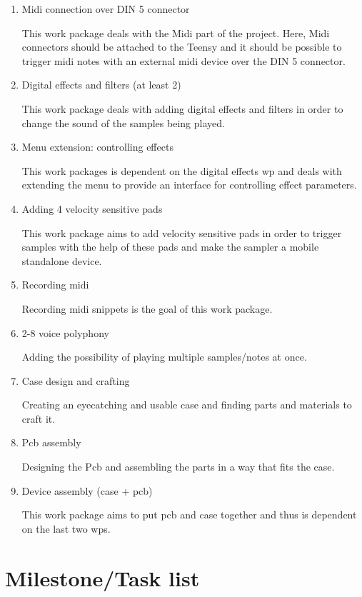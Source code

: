 \begin{enumerate}
	\item Midi connection over DIN 5 connector

		This work package deals with the Midi part of the project. Here, Midi connectors
		should be attached to the Teensy and it should be possible to trigger midi notes
		with an external midi device over the DIN 5 connector.

	\item Digital effects and filters (at least 2)

		This work package deals with adding digital effects and filters in order to
		change the sound of the samples being played.

	\item Menu extension: controlling effects

		This work packages is dependent on the digital effects wp and deals with extending
		the menu to provide an interface for controlling effect parameters.

	\item Adding 4 velocity sensitive pads

		This work package aims to add velocity sensitive pads in order to trigger samples with
		the help of these pads and make the sampler a mobile standalone device.

	\item Recording midi

		Recording midi snippets is the goal of this work package.

	\item 2-8 voice polyphony

		Adding the possibility of playing multiple samples/notes at once.
		
	\item Case design and crafting

		Creating an eyecatching and usable case and finding parts and materials to craft it.

	\item Pcb assembly

		Designing the Pcb and assembling the parts in a way that fits the case.

	\item Device assembly (case + pcb)

		This work package aims to put pcb and case together and thus is dependent on the last two wps.
\end{enumerate}



\section{Milestone/Task list}

